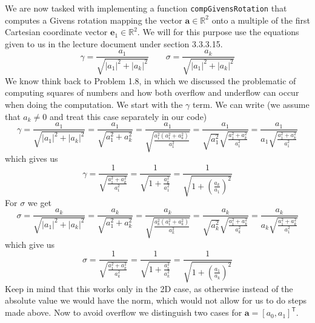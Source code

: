 \documentclass{article}
\begin{document}
 \noindent We are now tasked with implementing a function \verb|compGivensRotation| that computes a Givens rotation mapping the vector $\mathbf{a} \in \mathbb{R}^{2}$ onto a multiple of the first Cartesian coordinate vector $\mathbf{e}_{1}\in \mathbb{R}^{2}$. We will for this purpose use the equations given to us in the lecture document under section 3.3.3.15.
\begin{equation*}
    \gamma = \frac{a_{1}}{\sqrt{\left\lvert a_{1}\right\rvert^{2} + \left\lvert a_{k} \right\rvert^{2}}} \qquad \sigma= \frac{a_{k}}{\sqrt{\left\lvert a_{1}\right\rvert^{2} + \left\lvert a_{k} \right\rvert^{2}}}
\end{equation*}
We know think back to Problem 1.8, in which we discussed the problematic of computing squares of numbers and how both overflow and underflow can occur when doing the computation. We start with the $\gamma$ term. We can write (we assume that $a_{k} \neq 0$ and treat this case separately in our code)
\begin{equation*}
    \gamma = \frac{a_{1}}{\sqrt{\left\lvert a_{1}\right\rvert^{2} + \left\lvert a_{k} \right\rvert^{2}}} =\frac{a_{1}}{\sqrt{ a_{1}^{2} + a_{k}^{2}}} =\frac{a_{1}}{\sqrt{\frac{a_{1}^{2}\left(a_{1}^{2} +  a_{k}^{2}\right)}{a_{1}^{2}}}} = \frac{a_{1}}{\sqrt{a_{1}^{2}}\sqrt{\frac{a_{1}^{2} +  a_{k}^{2}}{a_{1}^{2}}}} =  \frac{a_{1}}{a_{1}\sqrt{\frac{a_{1}^{2} +  a_{k}^{2}}{a_{1}^{2}}}}
\end{equation*}
which gives us
\begin{equation*}
    \gamma = \frac{1}{\sqrt{\frac{a_{1}^{2} +  a_{k}^{2}}{a_{1}^{2}}}} = \frac{1}{\sqrt{1 + \frac{a_{k}^{2}}{a_{1}^{2}}}} = \frac{1}{\sqrt{1 + \left(\frac{a_{k}}{a_{1}}\right)^{2}}}
\end{equation*}
For $\sigma$ we get 
\begin{equation*}
    \sigma = \frac{a_{k}}{\sqrt{\left\lvert a_{1}\right\rvert^{2} + \left\lvert a_{k} \right\rvert^{2}}} =\frac{a_{k}}{\sqrt{ a_{1}^{2} + a_{k}^{2}}} =\frac{a_{k}}{\sqrt{\frac{a_{k}^{2}\left(a_{1}^{2} +  a_{k}^{2}\right)}{a_{k}^{2}}}} = \frac{a_{k}}{\sqrt{a_{k}^{2}}\sqrt{\frac{a_{1}^{2} +  a_{k}^{2}}{a_{k}^{2}}}} =  \frac{a_{k}}{a_{k}\sqrt{\frac{a_{1}^{2} +  a_{k}^{2}}{a_{1}^{2}}}}
\end{equation*}
which give us
\begin{equation*}
    \sigma = \frac{1}{\sqrt{\frac{a_{1}^{2} + a_{k}^{2}}{a_{k}^{2}}}} = \frac{1}{\sqrt{1 + \frac{a_{1}^{2}}{a_{k}^{2}}}} = \frac{1}{\sqrt{1 + \left(\frac{a_{1}}{a_{k}}\right)^{2}}}
\end{equation*}
Keep in mind that this works only in the 2D case, as otherwise instead of the absolute value we would have the norm, which would not allow for us to do steps made above. Now to avoid overflow we distinguish two cases  for $\mathbf{a} = \left[a_{0}, a_{1}\right]^{\mathsf{T}}$.
\end{document}
